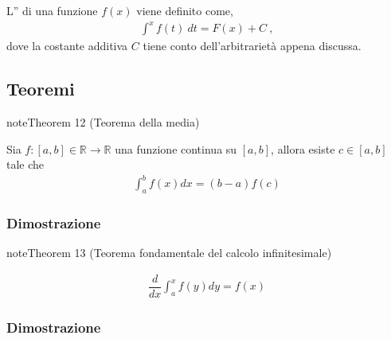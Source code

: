 \documentclass[letterpaper,10pt,italian]{jupyterBook}
\begin{document}
\sphinxAtStartPar
L” di una funzione \(f(x)\) viene definito come,
\begin{equation*}
\begin{split}\int^x f(t) \ dt = F(x) + C \ ,\end{split}
\end{equation*}
\sphinxAtStartPar
dove la costante additiva \(C\) tiene conto dell’arbitrarietà appena discussa.


\subsection{Teoremi}
\label{\detokenize{ch/infinitesimal_calculus/integrals:teoremi}}\label{\detokenize{ch/infinitesimal_calculus/integrals:infinitesimal-calculus-integrals-thm}}

\label{ch/infinitesimal_calculus/integrals:integrals:thm:avg}
\begin{sphinxadmonition}{note}{Theorem 12 (Teorema della media)}



\sphinxAtStartPar
Sia \(f: [a,b] \in \mathbb{R} \rightarrow \mathbb{R}\) una funzione continua su \([a,b]\), allora esiste \(c \in [a,b]\) tale che
\begin{equation*}
\begin{split}\int_{a}^{b} f(x) dx = (b-a) f(c) \end{split}
\end{equation*}\end{sphinxadmonition}
\subsubsection*{Dimostrazione}

\sphinxAtStartPar
{}


\label{ch/infinitesimal_calculus/integrals:integrals:thm:fund}
\begin{sphinxadmonition}{note}{Theorem 13 (Teorema fondamentale del calcolo infinitesimale)}


\begin{equation*}
\begin{split}\dfrac{d}{dx} \int_{a}^{x} f(y) dy = f(x) \end{split}
\end{equation*}\end{sphinxadmonition}
\subsubsection*{Dimostrazione}
\end{document}
